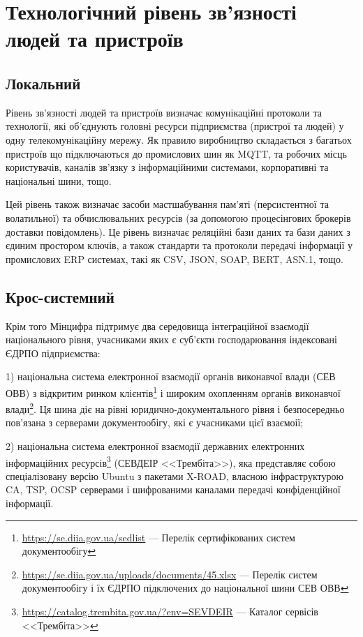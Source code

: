 \newpage
\section{Технологічний рівень зв'язності людей та пристроїв}

\subsection{Локальний}
Рівень зв'язності людей та пристроїв визначає комунікаційні протоколи та технології,
які об'єднують головні ресурси підприємства (пристрої та людей) у одну
телекомунікаційну мережу. Як правило виробництво складається з багатьох пристроїв
що підключаються до промислових шин як MQTT, та робочих місць користувачів,
каналів зв'язку з інформаційними системами, корпоративні та національні шини, тощо.

Цей рівень також визначає засоби мастшабування пам'яті (персистентної та волатильної) та
обчислювальних ресурсів (за допомогою процесінгових брокерів доставки повідомлень).
Це рівень визначає реляційні бази даних та бази даних з єдиним простором ключів,
а також стандарти та протоколи передачі інформації у промислових ERP системах,
такі як CSV, JSON, SOAP, BERT, ASN.1, тощо.

\subsection{Крос-системний}
Крім того Мінцифра підтримує два середовища інтеграційної взаємодії національного рівня,
учасниками яких є суб'єкти господарювання індексовані ЄДРПО підприємства:

1) національна система електронної взаємодії органів виконавчої влади (СЕВ ОВВ)
   з відкритим ринком клієнтів\footnote{\url{https://se.diia.gov.ua/sedlist} — Перелік сертифікованих систем документообігу}
   і широким охопленням органів виконавчої влади\footnote{\url{https://se.diia.gov.ua/uploads/documents/45.xlsx} — Перелік систем документообігу і їх ЄДРПО підключених до національної шини СЕВ ОВВ}.
   Ця шина діє на рівні юридично-документального рівня і безпосередньо пов'язана з серверами
   документообігу, які є учасниками цієї взаємоії;

2) національна система електронної взаємодії державних електронних інформаційних
   ресурсів\footnote{\url{https://catalog.trembita.gov.ua/?env=SEVDEIR} — Каталог сервісів <<Трембіта>>} (СЕВДЕІР <<Трембіта>>),
   яка представляє собою спеціалізовану версію Ubuntu з пакетами X-ROAD,
   власною інфраструктурою CA, TSP, OCSP серверами і шифрованими каналами
   передачі конфіденційної інформації.

